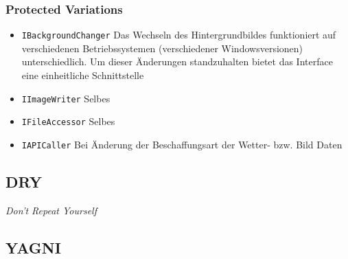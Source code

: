 \subsubsection{Protected Variations}
\begin{itemize}
	\item \texttt{IBackgroundChanger} Das Wechseln des Hintergrundbildes funktioniert auf verschiedenen Betriebssystemen (verschiedener Windowsversionen) unterschiedlich. Um dieser Änderungen standzuhalten bietet das Interface eine einheitliche Schnittstelle
	\item \texttt{IImageWriter} Selbes
	\item \texttt{IFileAccessor} Selbes
	\item \texttt{IAPICaller} Bei Änderung der Beschaffungsart der Wetter- bzw. Bild Daten 
\end{itemize}
\subsection{DRY}
\textit{Don't Repeat Yourself} 
% 
\subsection{YAGNI}
